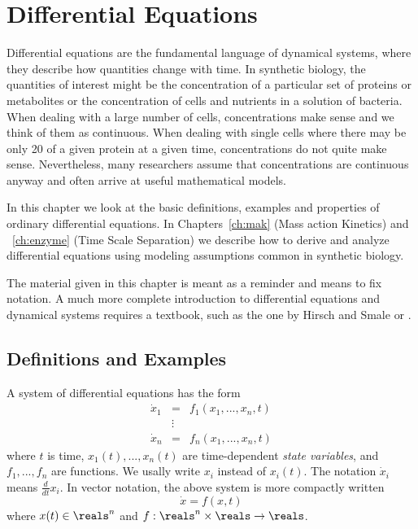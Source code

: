 \chapter{Differential Equations}


Differential equations are the fundamental language of dynamical
systems, where they describe how quantities change with time. In
synthetic biology, the quantities of interest might be the
concentration of a particular set of proteins or metabolites or the
concentration of cells and nutrients in a solution of bacteria. When
dealing with a large number of cells, concentrations make sense and we
think of them as continuous. When dealing with single cells where
there may be only 20 of a given protein at a given time,
concentrations do not quite make sense. Nevertheless, many researchers
assume that concentrations are continuous anyway and often arrive at
useful mathematical models. 

In this chapter we look at the basic definitions, examples and
properties of ordinary differential equations. In
Chapters~\ref{ch:mak} (Mass action Kinetics) and ~\ref{ch:enzyme}
(Time Scale Separation) we describe how to derive and analyze
differential equations using modeling assumptions common in synthetic
biology.

The material given in this chapter is meant as a reminder and means to
fix notation. A much more complete introduction to differential equations
and dynamical systems requires a textbook, such as the one by Hirsch
and Smale \cite{hirsch-smale} or \cite{khalil}.

\section{Definitions and Examples}

A system of differential equations has the form
%
\begin{eqnarray*}
\dot x_1 & = & f_1 (x_1, ..., x_n, t ) \\
         & \vdots & \\
\dot x_n & = & f_n ( x_1, ..., x_n, t )
\end{eqnarray*}
%
where $t$ is time, $x_1(t), ..., x_n(t)$ are time-dependent {\em state
  variables}, and $f_1, ..., f_n$ are functions. We usally write $x_i$
instead of $x_i(t)$. The notation $\dot x_i$ means $\frac{d}{dt}x_i$. In
vector notation, the above system is more compactly written
%
\begin{equation} \label{eqn:ode}
\dot x = f( x, t )
\end{equation}
%
where $x(t) \in \reals^n$ and $f : \reals^n \times \reals \rightarrow \reals$. 

